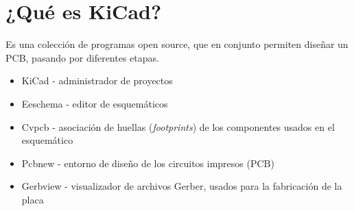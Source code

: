 \section{¿Qué es KiCad?}

Es una colección de programas open source, que en conjunto permiten diseñar un PCB, pasando por diferentes etapas.

\begin{itemize}
	\item KiCad - administrador de proyectos
	\item Eeschema - editor de esquemáticos
	\item Cvpcb - asociación de huellas (\textit{footprints}) de los componentes usados en el esquemático
	\item Pcbnew - entorno de diseño de los circuitos impresos (PCB)
	\item Gerbview - visualizador de archivos Gerber, usados para la fabricación de la placa
\end{itemize}



